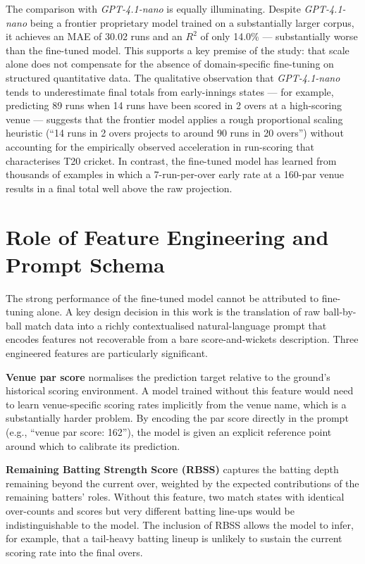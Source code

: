 The comparison with \textit{GPT-4.1-nano} is equally illuminating. Despite \textit{GPT-4.1-nano} being a frontier proprietary model trained on a substantially larger corpus, it achieves an MAE of 30.02 runs and an $R^2$ of only 14.0\% --- substantially worse than the fine-tuned model. This supports a key premise of the study: that scale alone does not compensate for the absence of domain-specific fine-tuning on structured quantitative data. The qualitative observation that \textit{GPT-4.1-nano} tends to underestimate final totals from early-innings states --- for example, predicting 89 runs when 14 runs have been scored in 2 overs at a high-scoring venue --- suggests that the frontier model applies a rough proportional scaling heuristic (``14 runs in 2 overs projects to around 90 runs in 20 overs'') without accounting for the empirically observed acceleration in run-scoring that characterises T20 cricket. In contrast, the fine-tuned model has learned from thousands of examples in which a 7-run-per-over early rate at a 160-par venue results in a final total well above the raw projection.

\section{Role of Feature Engineering and Prompt Schema}

The strong performance of the fine-tuned model cannot be attributed to fine-tuning alone. A key design decision in this work is the translation of raw ball-by-ball match data into a richly contextualised natural-language prompt that encodes features not recoverable from a bare score-and-wickets description. Three engineered features are particularly significant.

\textbf{Venue par score} normalises the prediction target relative to the ground's historical scoring environment. A model trained without this feature would need to learn venue-specific scoring rates implicitly from the venue name, which is a substantially harder problem. By encoding the par score directly in the prompt (e.g., ``venue par score: 162''), the model is given an explicit reference point around which to calibrate its prediction.

\textbf{Remaining Batting Strength Score (RBSS)} captures the batting depth remaining beyond the current over, weighted by the expected contributions of the remaining batters' roles. Without this feature, two match states with identical over-counts and scores but very different batting line-ups would be indistinguishable to the model. The inclusion of RBSS allows the model to infer, for example, that a tail-heavy batting lineup is unlikely to sustain the current scoring rate into the final overs.

